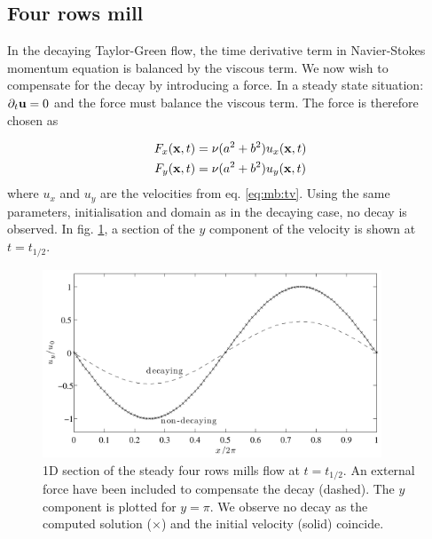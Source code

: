 \subsection{Four rows mill}\label{sec:mb:four_rows}
In the decaying Taylor-Green flow, the time derivative term in
Navier-Stokes momentum equation is balanced by the viscous term. We
now wish to compensate for the decay by introducing a force. In a
steady state situation: $\partial_t\mathbf{u} = 0$ and the force must
balance the viscous term. The force is therefore chosen as

\begin{equation}
\begin{aligned}
F_x(\mathbf{x}, t) &= \nu(a^2 + b^2)u_x(\mathbf{x}, t) \\
F_y(\mathbf{x}, t) &= \nu(a^2 + b^2)u_y(\mathbf{x}, t) 
\end{aligned}
\end{equation}
where $u_x$ and $u_y$ are the velocities from
eq. \eqref{eq:mb:tv}. Using the same parameters, initialisation and
domain as in the decaying case, no decay is observed. In
fig. \ref{fig:mb:four_mill}, a section of the $y$ component of the
velocity is shown at $t = t_{1/2}$.

\begin{figure}
\begin{center}
\includegraphics[width=0.9\textwidth]{fig/four_mill.pdf}
\end{center}
\caption[1D section of the steady four rows mills flow at $t =
  t_{1/2}$.]{1D section of the steady four rows mills flow at $t =
  t_{1/2}$. An external force have been included to compensate the
  decay (dashed). The $y$ component is plotted for $y = \pi$. We
  observe no decay as the computed solution ($\times$) and the initial
  velocity (solid) coincide.}
\label{fig:mb:four_mill}
\end{figure}

